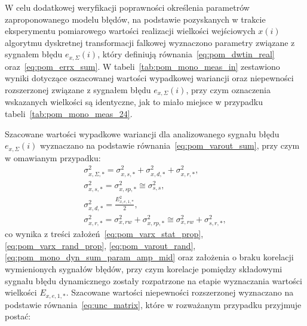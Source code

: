 W celu dodatkowej weryfikacji poprawności określenia parametrów zaproponowanego modelu błędów, na podstawie pozyskanych w trakcie eksperymentu pomiarowego wartości realizacji wielkości wejściowych $x(i)$ algorytmu dyskretnej transformacji falkowej wyznaczono parametry związane z sygnałem błędu $e_{x,\Sigma}(i)$, który definiują równania~\eqref{eq:pom_dwtin_real} oraz~\eqref{eq:pom_errx_sum}. W tabeli~\ref{tab:pom_mono_meas_in} zestawiono wyniki dotyczące oszacowanej wartości wypadkowej wariancji oraz niepewności rozszerzonej związane z sygnałem błędu $e_{x,\Sigma}(i)$, przy czym oznaczenia wskazanych wielkości są identyczne, jak to miało miejsce w przypadku tabeli~\ref{tab:pom_mono_meas_24}.

Szacowane wartości wypadkowe wariancji dla analizowanego sygnału błędu $e_{x,\Sigma}(i)$ wyznaczano na podstawie równania~\eqref{eq:pom_varout_sum}, przy czym w omawianym przypadku:
\begin{gather}
\sigma_{x,\Sigma,*}^{2} = \sigma_{x,s,*}^{2} + \sigma_{x,d,*}^{2} + \sigma_{x,r,*}^{2} \label{eq:pom_varx_sum_all}, \\
\sigma_{x,s,*}^{2} = \sigma_{x,sp,*}^{2} \cong \sigma_{s,s}^{2} \label{eq:pom_varx_sum_stat}, \\
\sigma_{x,d,*}^{2} = \frac{E_{x,e,1,*}^{2}}{2} \label{eq:pom_varx_sum_dyn}, \\
\sigma_{x,r,*}^{2} = \sigma_{x,rw}^{2} + \sigma_{x,rp,*}^{2} \cong \sigma_{x,rw}^{2} + \sigma_{s,r,*}^{2} \label{eq:pom_varx_sum_rand},
\end{gather}
co wynika z treści założeń~\eqref{eq:pom_varx_stat_prop}, \eqref{eq:pom_varx_rand_prop}, \eqref{eq:pom_varout_rand}, \eqref{eq:pom_mono_dyn_sum_param_amp_mid} oraz założenia o braku korelacji wymienionych sygnałów błędów, przy czym korelacje pomiędzy składowymi sygnału błędu dynamicznego zostały rozpatrzone na etapie wyznaczania wartości wielkości $E_{x,e,1,*}$. Szacowane wartości niepewności rozszerzonej wyznaczano na podstawie równania~\eqref{eq:unc_matrix}, które w rozważanym przypadku przyjmuje postać:
